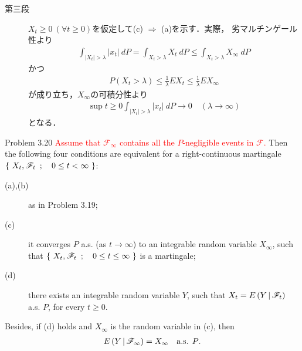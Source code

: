\begin{prf}
\begin{description}
			\item[第三段]
				$X_t \geq 0\ (\forall t \geq 0)$を仮定して(c) $\Rightarrow$ (a)を示す．実際，
				劣マルチンゲール性より
				\begin{align}
					\int_{|X_t| > \lambda} |x_t|\ dP
					= \int_{X_t > \lambda} X_t\ dP
					\leq \int_{X_t > \lambda} X_\infty\ dP
				\end{align}
				かつ
				\begin{align}
					P\left( X_t > \lambda \right)
					\leq \frac{1}{\lambda} EX_t
					\leq \frac{1}{\lambda} EX_\infty
				\end{align}
				が成り立ち，$X_\infty$の可積分性より
				\begin{align}
					\sup{t \geq 0}{\int_{|X_t| > \lambda} |x_t|\ dP} 
					\longrightarrow 0
					\quad (\lambda \longrightarrow \infty)
				\end{align}
				となる．
				\QED
		\end{description}
	\end{prf}
	
	\begin{itembox}[l]{Problem 3.20}
		\textcolor{red}{Assume that $\mathscr{F}_\infty$ contains all the $P$-negligible events in $\mathscr{F}$.}
		Then the following four conditions are equivalent for a right-continuous martingale
		$\left\{\ X_t,\mathscr{F}_t\ \, ; \quad 0 \leq t < \infty\ \right\}$:
		\begin{description}
			\item[(a),(b)] as in Problem 3.19;
			\item[(c)] it converges $P$ a.s. (as $t \to \infty$) to an integrable random variable $X_\infty$,
				such that $\left\{\ X_t,\mathscr{F}_t\ \, ; \quad 0 \leq t \leq \infty\ \right\}$ is a martingale;
			\item[(d)] there exists an integrable random variable $Y$, such that $X_t = E\left( Y \, \middle|\, \mathscr{F}_t \right)$ a.s. $P$,
				for every $t \geq 0$.
		\end{description}
		Besides, if (d) holds and $X_\infty$ is the random variable in (c), then
		\begin{align}
			E\left( Y \, \middle|\, \mathscr{F}_\infty \right) = X_\infty
			\quad \mbox{a.s. $P$}.
			\label{eq:chapter_1_Problem_3_20_1}
		\end{align}
	\end{itembox}
	
